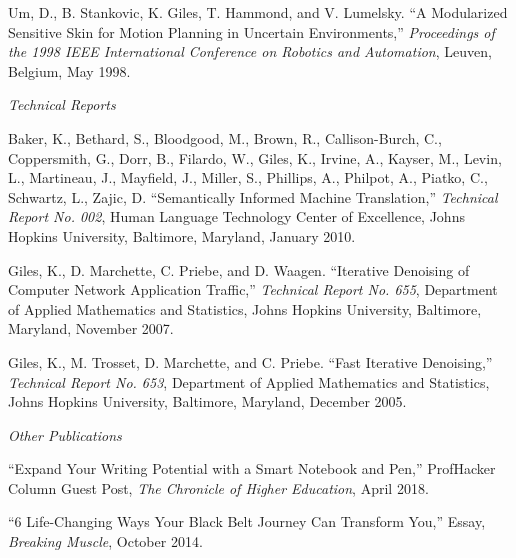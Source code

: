 \documentclass[11pt,article,oneside]{memoir}
\begin{document}
\ind Um, D., B. Stankovic, K. Giles, T. Hammond, and V. Lumelsky. “A Modularized Sensitive Skin for Motion Planning in Uncertain Environments,” \emph{Proceedings of the 1998 IEEE International Conference on Robotics and Automation}, Leuven, Belgium, May 1998.



\bigskip

\noindent\emph{Technical Reports \vspace{0.05in}}

 

\ind Baker, K., Bethard, S., Bloodgood, M., Brown, R., Callison-Burch, C., Coppersmith, G., Dorr, B., Filardo, W., Giles, K., Irvine, A., Kayser, M., Levin, L., Martineau, J., Mayfield, J., Miller, S., Phillips, A., Philpot, A., Piatko, C., Schwartz, L., Zajic, D. “Semantically Informed Machine Translation,” \emph{Technical Report No. 002}, Human Language Technology Center of Excellence, Johns Hopkins University, Baltimore, Maryland, January 2010.

\ind Giles, K., D. Marchette, C. Priebe, and D. Waagen. “Iterative Denoising of Computer Network Application Traffic,” \emph{Technical Report No. 655}, Department of Applied Mathematics and Statistics, Johns Hopkins University, Baltimore, Maryland, November 2007.

\ind Giles, K., M. Trosset, D. Marchette, and C. Priebe. “Fast Iterative Denoising,” \emph{Technical Report No. 653}, Department of Applied Mathematics and Statistics, Johns Hopkins University, Baltimore, Maryland, December 2005.



\bigskip

\noindent\emph{Other Publications \vspace{0.05in}}

\ind “Expand Your Writing Potential with a Smart Notebook and Pen,” ProfHacker Column Guest Post, \emph{The Chronicle of Higher Education}, April 2018.

\ind “6 Life-Changing Ways Your Black Belt Journey Can Transform You,” Essay, \emph{Breaking Muscle}, October 2014.
\end{document}
